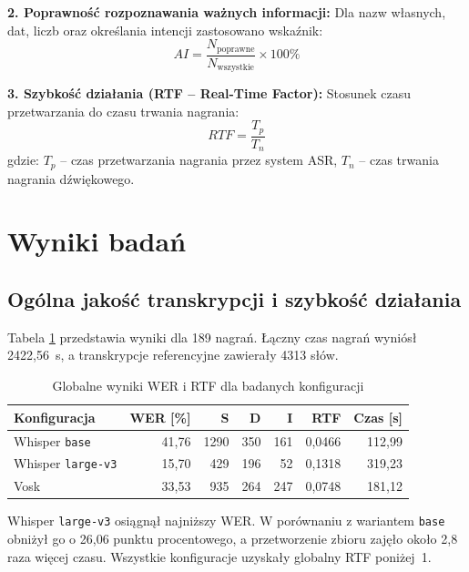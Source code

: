 \documentclass{article}
\begin{document}
\textbf{2. Poprawność rozpoznawania ważnych informacji:}
Dla nazw własnych, dat, liczb oraz określania intencji zastosowano wskaźnik:
\begin{equation}
AI = \frac{N_{\text{poprawne}}}{N_{\text{wszystkie}}} \times 100\%
\end{equation}

\textbf{3. Szybkość działania (RTF -- Real-Time Factor):}
Stosunek czasu przetwarzania do czasu trwania nagrania:
\begin{equation}
RTF = \frac{T_p}{T_n}
\end{equation}
gdzie: $T_p$ -- czas przetwarzania nagrania przez system ASR, $T_n$ -- czas trwania nagrania dźwiękowego.

\section{Wyniki badań}

\subsection{Ogólna jakość transkrypcji i szybkość działania}

Tabela \ref{tab:ogolne} przedstawia wyniki dla 189 nagrań. Łączny czas nagrań wyniósł 2422,56~s,
a transkrypcje referencyjne zawierały 4313 słów.

\begin{table}[htbp]
\centering
\caption{Globalne wyniki WER i RTF dla badanych konfiguracji}
\label{tab:ogolne}
\begin{tabular}{lrrrrrr}
\toprule
\textbf{Konfiguracja} & \textbf{WER [\%]} & \textbf{S} & \textbf{D} &
\textbf{I} & \textbf{RTF} & \textbf{Czas [s]} \\
\midrule
Whisper \texttt{base}     & 41,76 & 1290 & 350 & 161 & 0,0466 & 112,99 \\
Whisper \texttt{large-v3} & 15,70 &  429 & 196 &  52 & 0,1318 & 319,23 \\
Vosk                     & 33,53 &  935 & 264 & 247 & 0,0748 & 181,12 \\
\bottomrule
\end{tabular}
\end{table}

Whisper \texttt{large-v3} osiągnął najniższy WER. W porównaniu
z wariantem \texttt{base} obniżył go o 26,06 punktu procentowego,
a przetworzenie zbioru zajęło około 2,8 raza więcej czasu.
Wszystkie konfiguracje uzyskały globalny RTF poniżej~1.
\end{document}
